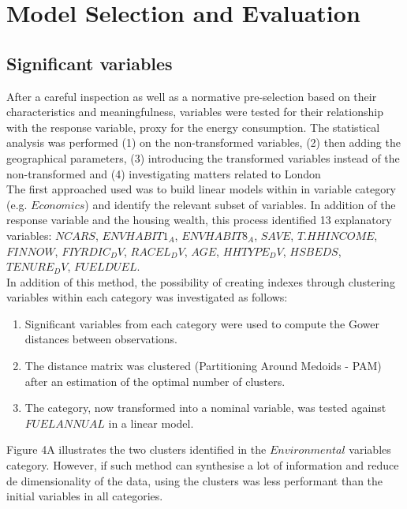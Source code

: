 \documentclass[12pt]{article}
\begin{document}
\section{Model Selection and Evaluation}
\subsection{Significant variables}
After a careful inspection as well as a normative pre-selection based on their characteristics and meaningfulness, variables were tested for their relationship with the response variable, proxy for the energy consumption. The statistical analysis was performed (1) on the non-transformed variables, (2) then adding the geographical parameters, (3) introducing the transformed variables instead of the non-transformed and (4) investigating matters related to London\\

The first approached used was to build linear models within in variable category (e.g. $Economics$) and identify the relevant subset of variables.  In addition of the response variable and the housing wealth, this process identified 13 explanatory variables: $NCARS$, $ENVHABIT1_A$, $ENVHABIT8_A$, $SAVE$, $T.HHINCOME$, $FINNOW$, $FIYRDIC_DV$, $RACEL_DV$, $AGE$, $HHTYPE_DV$, $HSBEDS$, $TENURE_DV$, $FUELDUEL$.\\
 
In addition of this method, the possibility of creating indexes through clustering variables within each category was investigated as follows:\\
\begin{enumerate}
\item Significant variables from each category were used to compute the Gower distances between observations.
\item The distance matrix was clustered (Partitioning Around Medoids - PAM) after an estimation of the optimal number of clusters.
\item The category, now transformed into a nominal variable, was tested against $FUELANNUAL$ in a linear model.\\
\end{enumerate}

Figure 4A illustrates the two clusters identified in the $Environmental$ variables category. However, if such method can synthesise a lot of information and reduce de dimensionality of the data, using the clusters was less performant than the initial variables in all categories.\\
\end{document}
